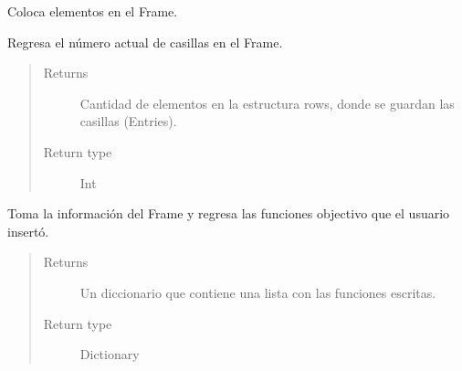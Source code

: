 \documentclass[letterpaper,10pt,english]{sphinxmanual}
\begin{document}
\begin{fulllineitems}
\begin{fulllineitems}
Coloca elementos en el Frame.

\end{fulllineitems}


\begin{fulllineitems}
\label{View/Main/ObjectiveFunction/FunctionFrame:View.Main.ObjectiveFunction.FunctionFrame.FunctionFrame.get_current_elements}
Regresa el número actual de casillas en el Frame.
\begin{quote}\begin{description}
\item[{Returns}] \leavevmode
Cantidad de elementos en la estructura rows, donde se guardan las casillas (Entries).

\item[{Return type}] \leavevmode
Int

\end{description}\end{quote}

\end{fulllineitems}


\begin{fulllineitems}
\label{View/Main/ObjectiveFunction/FunctionFrame:View.Main.ObjectiveFunction.FunctionFrame.FunctionFrame.get_information}
Toma la información del Frame y regresa las funciones objectivo que 
el usuario insertó.
\begin{quote}\begin{description}
\item[{Returns}] \leavevmode
Un diccionario que contiene una lista con las funciones escritas.

\item[{Return type}] \leavevmode
Dictionary

\end{description}\end{quote}

\end{fulllineitems}



\end{fulllineitems}
\end{document}
